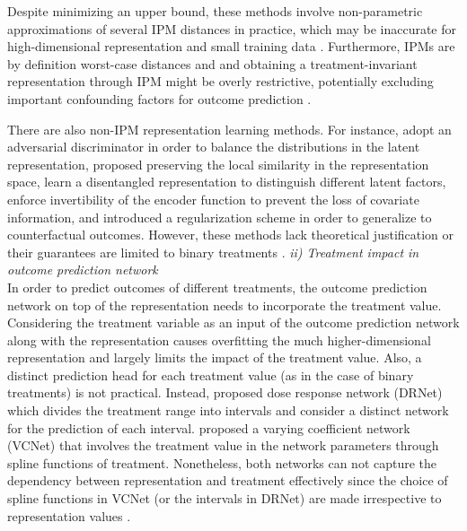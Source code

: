 \documentclass[letterpaper]{article} %
\begin{document}
Despite minimizing an upper bound, these methods involve non-parametric approximations of several IPM distances in practice, which may be inaccurate for high-dimensional representation and small training data \cite{liang2019estimating}.
Furthermore, IPMs are by definition worst-case distances and and obtaining a treatment-invariant representation through IPM might be overly restrictive, potentially excluding important confounding factors for outcome prediction \cite{zhang2020learning}. 

There are also non-IPM representation learning methods. 
For instance, \cite{Du_2021,NEURIPS2020_e7c573c1} adopt an adversarial discriminator in order to balance the distributions in the latent representation, \cite{Yao2018RepresentationLF} proposed preserving the local similarity in the representation space, \cite{hassanpour2019learning, wu2022learning} learn a disentangled representation to distinguish different latent factors, \cite{zhang2020learning} enforce invertibility of the encoder function to prevent the loss of covariate information, and \cite{alaa2017bayesian} introduced a regularization scheme in order to generalize to counterfactual outcomes.
However, these methods lack theoretical justification \cite{Du_2021, hassanpour2019learning, Yao2018RepresentationLF} or their guarantees are limited to binary treatments \cite{zhang2020learning, alaa2017bayesian}.
\newline
\newline
\textit{ii) Treatment impact in outcome prediction network}\\
In order to predict outcomes of different treatments, the outcome prediction network on top of the representation needs to incorporate the treatment value. Considering the treatment variable as an input of the outcome prediction network along with the representation
causes overfitting the much higher-dimensional representation and largely limits the impact of the treatment value. Also, a distinct prediction head for each treatment value (as in the case of binary treatments) is not practical.  
Instead, \cite{Schwab_2020} proposed dose response network (DRNet) which divides the treatment range into intervals and consider a distinct network for the prediction of each interval. \cite{nie2021vcnet} proposed a varying coefficient network (VCNet) that involves the treatment value in the network parameters through spline functions of treatment. 
Nonetheless, both networks can not capture the dependency between representation and treatment effectively since the choice of spline functions in VCNet (or the intervals in DRNet) are made irrespective to representation values \cite{zhang2022exploring}.
\end{document}
